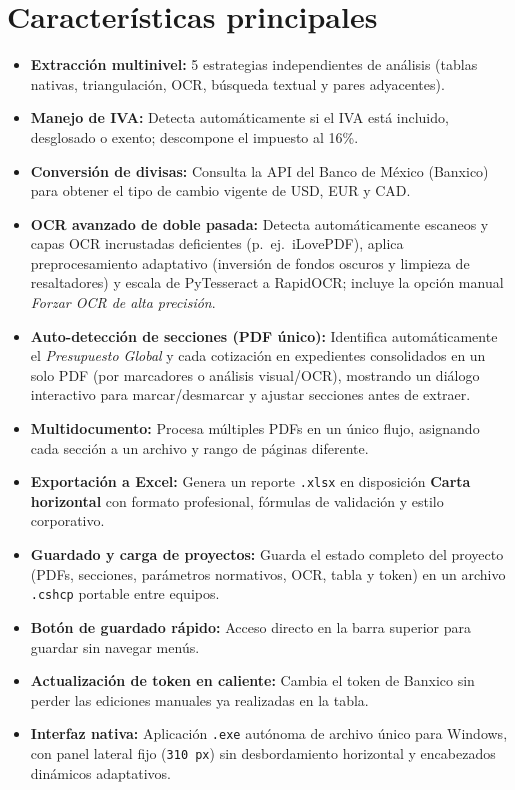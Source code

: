 \documentclass[12pt, a4paper, oneside]{report}
\begin{document}
\section{Características principales}

\begin{itemize}
  \item \textbf{Extracción multinivel:} 5 estrategias independientes de análisis
        (tablas nativas, triangulación, OCR, búsqueda textual y pares adyacentes).
  \item \textbf{Manejo de IVA:} Detecta automáticamente si el IVA está incluido,
        desglosado o exento; descompone el impuesto al 16\%.
  \item \textbf{Conversión de divisas:} Consulta la API del Banco de México (Banxico)
        para obtener el tipo de cambio vigente de USD, EUR y CAD.
  \item \textbf{OCR avanzado de doble pasada:} Detecta automáticamente escaneos y capas
        OCR incrustadas deficientes (p.\ ej.\ iLovePDF), aplica preprocesamiento
        adaptativo (inversión de fondos oscuros y limpieza de resaltadores) y escala de
        PyTesseract a RapidOCR; incluye la opción manual \textit{Forzar OCR de alta precisión}.
  \item \textbf{Auto-detección de secciones (PDF único):} Identifica automáticamente el
        \textit{Presupuesto Global} y cada cotización en expedientes consolidados en un
        solo PDF (por marcadores o análisis visual/OCR), mostrando un diálogo interactivo
        para marcar/desmarcar y ajustar secciones antes de extraer.
  \item \textbf{Multidocumento:} Procesa múltiples PDFs en un único flujo, asignando cada
        sección a un archivo y rango de páginas diferente.
  \item \textbf{Exportación a Excel:} Genera un reporte \texttt{.xlsx} en disposición
        \textbf{Carta horizontal} con formato profesional, fórmulas de validación y
        estilo corporativo.
  \item \textbf{Guardado y carga de proyectos:} Guarda el estado completo del
        proyecto (PDFs, secciones, parámetros normativos, OCR, tabla y token) en un
        archivo \texttt{.cshcp} portable entre equipos.
  \item \textbf{Botón de guardado rápido:} Acceso directo en la barra superior
        para guardar sin navegar menús.
  \item \textbf{Actualización de token en caliente:} Cambia el token de Banxico
        sin perder las ediciones manuales ya realizadas en la tabla.
  \item \textbf{Interfaz nativa:} Aplicación \texttt{.exe} autónoma de archivo único
        para Windows, con panel lateral fijo (\texttt{310 px}) sin desbordamiento
        horizontal y encabezados dinámicos adaptativos.
\end{itemize}
\end{document}
